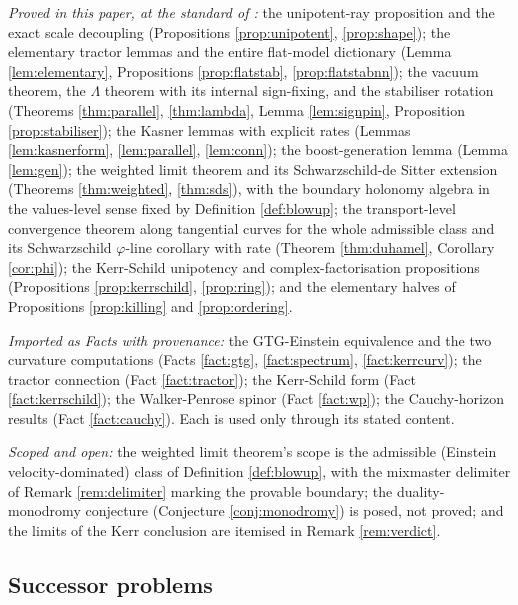 \documentclass[11pt]{article}
\theoremstyle{definition}
\begin{document}
\emph{Proved in this paper, at the standard of \cite{ButlerT1}:} the unipotent-ray proposition and the exact scale decoupling (Propositions \ref{prop:unipotent}, \ref{prop:shape}); the elementary tractor lemmas and the entire flat-model dictionary (Lemma \ref{lem:elementary}, Propositions \ref{prop:flatstab}, \ref{prop:flatstabnn}); the vacuum theorem, the $\Lambda$ theorem with its internal sign-fixing, and the stabiliser rotation (Theorems \ref{thm:parallel}, \ref{thm:lambda}, Lemma \ref{lem:signpin}, Proposition \ref{prop:stabiliser}); the Kasner lemmas with explicit rates (Lemmas \ref{lem:kasnerform}, \ref{lem:parallel}, \ref{lem:conn}); the boost-generation lemma (Lemma \ref{lem:gen}); the weighted limit theorem and its Schwarzschild-de Sitter extension (Theorems \ref{thm:weighted}, \ref{thm:sds}), with the boundary holonomy algebra in the values-level sense fixed by Definition \ref{def:blowup}; the transport-level convergence theorem along tangential curves for the whole admissible class and its Schwarzschild $\varphi$-line corollary with rate (Theorem \ref{thm:duhamel}, Corollary \ref{cor:phi}); the Kerr-Schild unipotency and complex-factorisation propositions (Propositions \ref{prop:kerrschild}, \ref{prop:ring}); and the elementary halves of Propositions \ref{prop:killing} and \ref{prop:ordering}.

\emph{Imported as Facts with provenance:} the GTG-Einstein equivalence and the two curvature computations (Facts \ref{fact:gtg}, \ref{fact:spectrum}, \ref{fact:kerrcurv}); the tractor connection (Fact \ref{fact:tractor}); the Kerr-Schild form (Fact \ref{fact:kerrschild}); the Walker-Penrose spinor (Fact \ref{fact:wp}); the Cauchy-horizon results (Fact \ref{fact:cauchy}). Each is used only through its stated content.

\emph{Scoped and open:} the weighted limit theorem's scope is the admissible (Einstein velocity-dominated) class of Definition \ref{def:blowup}, with the mixmaster delimiter of Remark \ref{rem:delimiter} marking the provable boundary; the duality-monodromy conjecture (Conjecture \ref{conj:monodromy}) is posed, not proved; and the limits of the Kerr conclusion are itemised in Remark \ref{rem:verdict}.

\subsection*{Successor problems}
\end{document}

